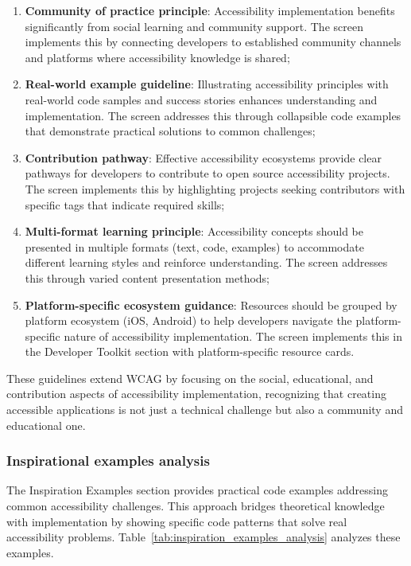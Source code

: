 \begin{enumerate}
    \item \textbf{Community of practice principle}: Accessibility implementation benefits significantly from social learning and community support. The screen implements this by connecting developers to established community channels and platforms where accessibility knowledge is shared;
    
    \item \textbf{Real-world example guideline}: Illustrating accessibility principles with real-world code samples and success stories enhances understanding and implementation. The screen addresses this through collapsible code examples that demonstrate practical solutions to common challenges;
    
    \item \textbf{Contribution pathway}: Effective accessibility ecosystems provide clear pathways for developers to contribute to open source accessibility projects. The screen implements this by highlighting projects seeking contributors with specific tags that indicate required skills;
    
    \item \textbf{Multi-format learning principle}: Accessibility concepts should be presented in multiple formats (text, code, examples) to accommodate different learning styles and reinforce understanding. The screen addresses this through varied content presentation methods;
    
    \item \textbf{Platform-specific ecosystem guidance}: Resources should be grouped by platform ecosystem (iOS, Android) to help developers navigate the platform-specific nature of accessibility implementation. The screen implements this in the Developer Toolkit section with platform-specific resource cards.
\end{enumerate}

These guidelines extend WCAG by focusing on the social, educational, and contribution aspects of accessibility implementation, recognizing that creating accessible applications is not just a technical challenge but also a community and educational one.

\subsubsection{Inspirational examples analysis}

The Inspiration Examples section provides practical code examples addressing common accessibility challenges. This approach bridges theoretical knowledge with implementation by showing specific code patterns that solve real accessibility problems. Table~\ref{tab:inspiration_examples_analysis} analyzes these examples.


